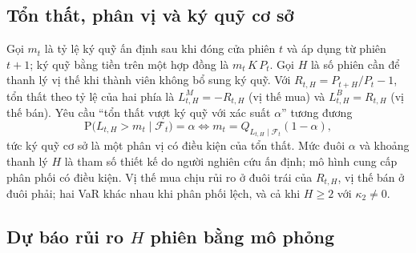 \documentclass[12pt,a4paper]{article}
\theoremstyle{definition}
\theoremstyle{remark}
\newcommand{\Prob}{\mathrm{P}}
\newcommand{\Fcal}{\mathcal{F}}
\begin{document}
\subsection{Tổn thất, phân vị và ký quỹ cơ sở}

Gọi $m_t$ là tỷ lệ ký quỹ ấn định sau khi đóng cửa phiên $t$ và áp dụng từ phiên $t+1$; ký quỹ bằng tiền trên một hợp đồng là $m_t\,K\,P_t$. Gọi $H$ là số phiên cần để thanh lý vị thế khi thành viên không bổ sung ký quỹ. Với $R_{t,H}=P_{t+H}/P_t-1$, tổn thất theo tỷ lệ của hai phía là $L^{M}_{t,H}=-R_{t,H}$ (vị thế mua) và $L^{B}_{t,H}=R_{t,H}$ (vị thế bán). Yêu cầu ``tổn thất vượt ký quỹ với xác suất $\alpha$'' tương đương
\begin{equation}
\Prob\big(L_{t,H}>m_t\mid\Fcal_t\big)=\alpha\iff m_t=Q_{L_{t,H}\mid\Fcal_t}(1-\alpha),
\end{equation}
tức ký quỹ cơ sở là một phân vị có điều kiện của tổn thất. Mức đuôi $\alpha$ và khoảng thanh lý $H$ là tham số thiết kế do người nghiên cứu ấn định; mô hình cung cấp phân phối có điều kiện. Vị thế mua chịu rủi ro ở đuôi trái của $R_{t,H}$, vị thế bán ở đuôi phải; hai VaR khác nhau khi phân phối lệch, và cả khi $H\ge2$ với $\kappa_2\neq0$.

\subsection{Dự báo rủi ro $H$ phiên bằng mô phỏng}\label{sec:mophongH}
\end{document}

